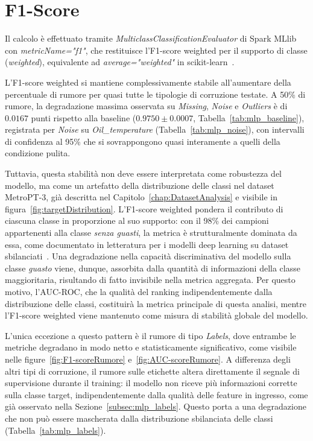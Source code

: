 \documentclass[../main.tex]{subfiles}
\begin{document}
\section{F1-Score}

Il calcolo è effettuato tramite \textit{MulticlassClassificationEvaluator} di Spark MLlib con \textit{metricName="f1"}, che restituisce l'F1-score weighted per il supporto di classe (\textit{weighted}), equivalente ad \textit{average="weighted"} in scikit-learn~\cite{scikit-learn}.

L'F1-score weighted si mantiene complessivamente stabile all'aumentare della percentuale di rumore per quasi tutte le tipologie di corruzione testate. A 50\% di rumore, la degradazione massima osservata su \textit{Missing}, \textit{Noise} e \textit{Outliers} è di $0.0167$ punti rispetto alla baseline ($0.9750 \pm 0.0007$, Tabella~\ref{tab:mlp_baseline}), registrata per \textit{Noise} su \textit{Oil\_temperature} (Tabella~\ref{tab:mlp_noise}), con intervalli di confidenza al 95\% che si sovrappongono quasi interamente a quelli della condizione pulita.

Tuttavia, questa stabilità non deve essere interpretata come robustezza del modello, ma come un artefatto della distribuzione delle classi nel dataset MetroPT-3, già descritta nel Capitolo~\ref{chap:DatasetAnalysis} e visibile in figura~\ref{fig:targetDistribution}. L'F1-score weighted pondera il contributo di ciascuna classe in proporzione al suo supporto: con il 98\% dei campioni appartenenti alla classe \textit{senza guasti}, la metrica è strutturalmente dominata da essa, come documentato in letteratura per i modelli deep learning su dataset sbilanciati~\cite{buda2018systematic, johnson2019survey}. Una degradazione nella capacità discriminativa del modello sulla classe \textit{guasto} viene, dunque, assorbita dalla quantità di informazioni della classe maggioritaria, risultando di fatto invisibile nella metrica aggregata. Per questo motivo, l'AUC-ROC, che la qualità del ranking indipendentemente dalla distribuzione delle classi, costituirà la metrica principale di questa analisi, mentre l'F1-score weighted viene mantenuto come misura di stabilità globale del modello.

L'unica eccezione a questo pattern è il rumore di tipo \textit{Labels}, dove entrambe le metriche degradano in modo netto e statisticamente significativo, come visibile nelle figure~\ref{fig:F1-scoreRumore} e~\ref{fig:AUC-scoreRumore}. A differenza degli altri tipi di corruzione, il rumore sulle etichette altera direttamente il segnale di supervisione durante il training: il modello non riceve più informazioni corrette sulla classe target, indipendentemente dalla qualità delle feature in ingresso, come già osservato nella Sezione~\ref{subsec:mlp_labels}. Questo porta a una degradazione che non può essere mascherata dalla distribuzione sbilanciata delle classi (Tabella~\ref{tab:mlp_labels}).
\end{document}
